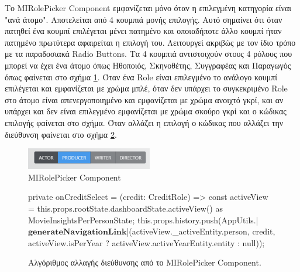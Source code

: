 Το MIRolePicker Component εμφανίζεται μόνο όταν η επιλεγμένη κατηγορία είναι "ανά άτομο". Αποτελείται από 4 κουμπιά μονής επιλογής. Αυτό σημαίνει ότι όταν πατηθεί ένα κουμπί επιλέγεται μένει πατημένο και οποιαδήποτε άλλο κουμπί ήταν πατημένο πρωτύτερα αφαιρείται η επιλογή του. Λειτουργεί ακριβώς με τον ίδιο τρόπο με τα παραδοσιακά Radio Buttons. Τα 4 κουμπιά αντιστοιχούν στους 4 ρόλους που μπορεί να έχει ένα άτομο όπως Ηθοποιός, Σκηνοθέτης, Συγγραφέας και Παραγωγός όπως φαίνεται στο σχήμα \ref{layout:mirolepicker}. Όταν ένα Role είναι επιλεγμένο το ανάλογο κουμπί επιλέγεται και εμφανίζεται με χρώμα μπλέ, όταν δεν υπάρχει το συγκεκριμένο Role στο άτομο είναι απενεργοποιημένο και εμφανίζεται με χρώμα ανοιχτό γκρί, και αν υπάρχει και δεν είναι επιλεγμένο εμφανίζεται με χρώμα σκούρο γκρί και ο κώδικας επιλογής φαίνεται στο σχήμα. Όταν αλλάζει η επιλογή ο κώδικας που αλλάζει την διεύθυνση φαίνεται στο σχήμα \ref{code:mirolepicker_urlchanger}.
\begin{figure}[h]
  \centering
  \includegraphics[width=55mm]{Chapters/5 - Architecture/Client/Images/mirolepicker.png}
  \caption{MIRolePicker Component}
  \label{layout:mirolepicker}
\end{figure}

\begin{figure}[H]
    \begin{TypeScriptcode}
private onCreditSelect = (credit: CreditRole) => {
  const activeView = this.props.rootState.dashboardState.activeView() as MovieInsightsPerPersonState;
  this.props.history.push(AppUtils.|$\textbf{generateNavigationLink}$|(activeView._activeEntity.person, credit, activeView.isPerYear ? activeView.activeYearEntity.entity : null));
}
    \end{TypeScriptcode}
    \caption{Αλγόριθμος αλλαγής διεύθυνσης από το MIRolePicker Component.}
   \label{code:mirolepicker_urlchanger}
\end{figure}